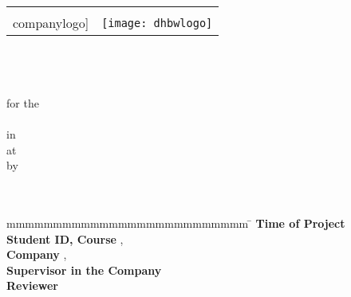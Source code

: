 \begin{titlepage}
	\begin{longtable}{>{\centering\arraybackslash}p{}
	>{\centering\arraybackslash}p{}}
	  {\texttt{[image: \\companylogo]}} & 
	  {\texttt{[image: dhbwlogo]}}
	\end{longtable}
	\enlargethispage{20mm}
	\begin{center}
	  \vspace*{12mm}    {\LARGE\textbf \reporttitle } \\
	  \vspace*{6mm}     {\large\textbf \reportsubtitle} \\
      \vspace*{12mm}    {\LARGE\textbf \reporttype} \\
	  \vspace*{8mm}     {for the} \\
	  \vspace*{3mm}     {\textbf \academicdegree} \\
	  \vspace*{12mm}    in \studiengang \\
	  \vspace*{3mm}     at \dhbw \\
	  \vspace*{12mm}    by \\
	  \vspace*{3mm}     {\large\textbf \student} \\
	  \vspace*{12mm}    \handoverdate\\
	\end{center}
	\vfill
	\begin{spacing}{1.2}
	\begin{tabbing}
		mmmmmmmmmmmmmmmmmmmmmmmmmm     \= \kill
		\textbf{Time of Project}           \>  \timerange\\
		\textbf{Student ID, Course}        \>  \matrikel, \kurs\\
		\textbf{Company}                   \>  \company, \lokation\\
		\textbf{Supervisor in the Company} \>  \tutor\\
		\textbf{Reviewer}                  \>  \prof
	\end{tabbing}
	\end{spacing}
\end{titlepage}